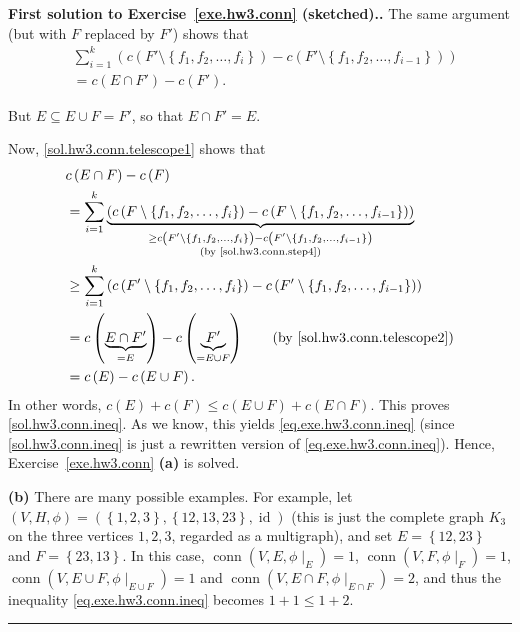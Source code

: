 \documentclass[numbers=enddot,12pt,final,onecolumn,notitlepage]{scrartcl}%
\theoremstyle{definition}
\newenvironment{proof}[1][Proof]{\noindent\textbf{#1.} }{\ \rule{0.5em}{0.5em}}
\let\sumnonlimits\sum
\renewcommand{\sum}{\sumnonlimits\limits}
\newcommand{\id}{\operatorname{id}}
\newcommand{\conn}{\operatorname{conn}}
\newcommand{\set}[1]{\left\{ #1 \right\}}
\newcommand{\tup}[1]{\left( #1 \right)}
\newcommand{\underbrack}[2]{\underbrace{#1}_{\substack{#2}}}
\begin{document}
\begin{proof}[First solution to Exercise~\ref{exe.hw3.conn}
(sketched).]
The same argument (but with $F$ replaced by $F'$) shows that
\begin{align}
& \sum_{i=1}^k
   \tup{c \tup{F' \setminus \set{f_1, f_2, \ldots, f_i}}
        - c \tup{F' \setminus \set{f_1, f_2, \ldots, f_{i-1}}}}
\nonumber \\
&= c \tup{E \cap F'} - c \tup{F'} .
\label{sol.hw3.conn.telescope2}
\end{align}

But $E \subseteq E \cup F = F'$, so that $E \cap F' = E$.

Now, \eqref{sol.hw3.conn.telescope1} shows that
\begin{align*}
& c \tup{E \cap F} - c \tup{F} \\
&= \sum_{i=1}^k
   \underbrack{\tup{c \tup{F \setminus \set{f_1, f_2, \ldots, f_i}}
               - c \tup{F \setminus \set{f_1, f_2, \ldots, f_{i-1}}}}}
              {\geq
               c \tup{F' \setminus \set{f_1, f_2, \ldots, f_i}}
               - c \tup{F' \setminus \set{f_1, f_2, \ldots, f_{i-1}}}
               \\ \text{(by \eqref{sol.hw3.conn.step4})}} \\
&\geq \sum_{i=1}^k
   \tup{c \tup{F' \setminus \set{f_1, f_2, \ldots, f_i}}
        - c \tup{F' \setminus \set{f_1, f_2, \ldots, f_{i-1}}}} \\
&= c \tup{\underbrace{E \cap F'}_{= E}}
    - c \tup{\underbrace{F'}_{= E \cup F}}
\qquad \left(\text{by \eqref{sol.hw3.conn.telescope2}}\right) \\
&= c \tup{E} - c \tup{E \cup F} .
\end{align*}
In other words,
$c\tup{E} + c\tup{F} \leq c\tup{E \cup F} + c\tup{E \cap F}$.
This proves \eqref{sol.hw3.conn.ineq}.
As we know, this yields \eqref{eq.exe.hw3.conn.ineq}
(since \eqref{sol.hw3.conn.ineq} is just a rewritten version of
\eqref{eq.exe.hw3.conn.ineq}).
Hence, Exercise~\ref{exe.hw3.conn} \textbf{(a)} is solved.

\textbf{(b)} There are many possible examples. \newline
For example, let
$\tup{V, H, \phi} = \tup{\set{1, 2, 3}, \set{12, 13, 23}, \id}$
(this is just the complete graph $K_3$ on the three vertices
$1, 2, 3$, regarded as a multigraph),
and set $E = \set{12, 23}$ and $F = \set{23, 13}$.
In this case,
$\conn \tup{V, E, \phi\mid_E} = 1$,
$\conn \tup{V, F, \phi\mid_F} = 1$,
$\conn \tup{V, E \cup F, \phi\mid_{E \cup F}} = 1$
and
$\conn \tup{V, E \cap F, \phi\mid_{E \cap F}} = 2$,
and thus the inequality \eqref{eq.exe.hw3.conn.ineq}
becomes $1 + 1 \leq 1 + 2$.
\end{proof}
\end{document}
